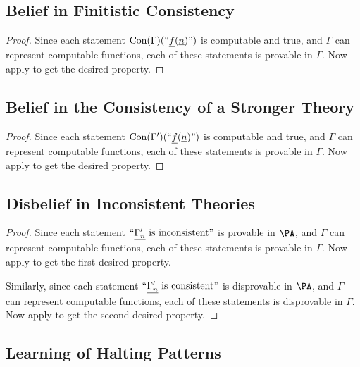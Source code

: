 \documentclass[authordate,onecolumn,noenvironments]{miri-tech-article}
\numberwithin{equation}{subsection}
\newcommand{\quot}[1]{``#1"}
\newcommand{\enc}[1]{{\underline{#1}}}
\newcommand{\nn}{n}
\newcommand{\representscomputations}{can represent computable functions}
\newcommand{\Theory}{\Gamma}
\newcommand{\consen}{\operatorname{Con}}
\begin{document}
\subsection{Belief in Finitistic Consistency}\label{app:pac}

\restatepac*

\begin{proof}
  Since each statement $\consen(\Theory)(\quot{\enc{f}(\enc{\nn})})$ is computable and true, and $\Theory$ \representscomputations, each of these statements is provable in $\Theory$.  Now apply  to get the desired property.
\end{proof}

\subsection{Belief in the Consistency of a Stronger Theory}\label{app:pazfc}

\restatepazfc*

\begin{proof}
  Since each statement $\consen(\Theory')(\quot{\enc{f}(\enc{\nn})})$ is computable and true, and $\Theory$ \representscomputations, each of these statements is provable in $\Theory$.  Now apply  to get the desired property.
\end{proof}

\subsection{Disbelief in Inconsistent Theories}\label{app:incons}

\restateincons*

\begin{proof}
  Since each statement 
  $\quot{\enc{\Theory^\prime_\nn}\textnormal{\ is inconsistent}}$ is provable in $\PA$, and $\Theory$ \representscomputations, each of these statements is provable in $\Theory$.  Now apply  to get the first desired property.

  Similarly, since each statement $\quot{\enc{\Theory^\prime_\nn}\textnormal{\ is consistent}}$ is disprovable in $\PA$, and $\Theory$ \representscomputations, each of these statements is disprovable in $\Theory$.  Now apply  to get the second desired property.
\end{proof}

\subsection{Learning of Halting Patterns}\label{app:halts}
\end{document}
